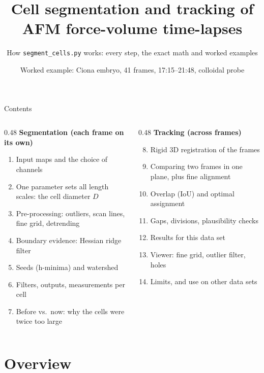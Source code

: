 \documentclass[aspectratio=169,9pt]{beamer}
\title{Cell segmentation and tracking of AFM force-volume time-lapses}
\subtitle{How \texttt{segment\_cells.py} works: every step, the exact math and worked examples}
\date{Worked example: Ciona embryo, 41 frames, 17:15--21:48, colloidal probe}
\author{}
\begin{document}
\maketitle

\begin{frame}{Contents}
\begin{columns}[T]
\begin{column}{0.48\textwidth}
\textbf{Segmentation (each frame on its own)}
\begin{enumerate}
\item Input maps and the choice of channels
\item One parameter sets all length scales: the cell diameter $D$
\item Pre-processing: outliers, scan lines, fine grid, detrending
\item Boundary evidence: Hessian ridge filter
\item Seeds (h-minima) and watershed
\item Filters, outputs, measurements per cell
\item Before vs.\ now: why the cells were twice too large
\end{enumerate}
\end{column}
\begin{column}{0.48\textwidth}
\textbf{Tracking (across frames)}
\begin{enumerate}\setcounter{enumi}{7}
\item Rigid 3D registration of the frames
\item Comparing two frames in one plane, plus fine alignment
\item Overlap (IoU) and optimal assignment
\item Gaps, divisions, plausibility checks
\item Results for this data set
\item Viewer: fine grid, outlier filter, holes
\item Limits, and use on other data sets
\end{enumerate}
\end{column}
\end{columns}
\end{frame}

\section{Overview}
\end{document}
